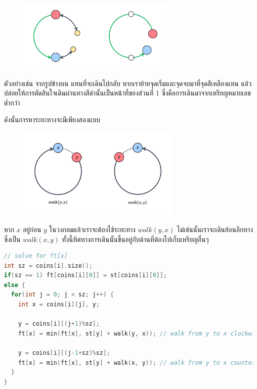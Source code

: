\documentclass[12pt]{article}
\begin{document}

\begin{figure}[h]
  \centering
  \includegraphics[height=3.5cm]{./images/coins3.png}
\end{figure}

ตัวอย่างเช่น จากรูปข้างบน แทนที่จะเดินไปกลับ หากเราย้ายจุดเริ่มและจุดจบมาที่จุดสีเหลืองแทน แล้วปล่อยให้การตัดสินใจเดินผ่านทางสีดำนั้นเป็นหน้าที่ของส่วนที่ 1 ซึ่งคือการเดินมาจากเหรียญหมายเลขต่ำกว่า

\newpage
ดังนั้นการหาระยะทางจะมีเพียงสองแบบ

\begin{figure}[h]
  \centering
  \includegraphics[height=4.5cm]{./images/coins4.png}
\end{figure}

หาก $x$ อยู่ก่อน $y$ ในวงกลมแล้วเราจะต้องใช้ระยะทาง $walk(y, x)$ ไม่เช่นนั้นเราจะเดินย้อนอีกทางซึ่งเป็น $walk(x, y)$ ทั้งนี้ทิศทางการเดินนั้นขึ้นอยู่กับด้านที่ต้องไปเก็บเหรียญอื่นๆ

\begin{lstlisting}[language=C++]
// solve for ft[x]
int sz = coins[i].size();
if(sz == 1) ft[coins[i][0]] = st[coins[i][0]];
else {
  for(int j = 0; j < sz; j++) {
    int x = coins[i][j], y;

    y = coins[i][(j+1)%sz];
    ft[x] = min(ft[x], st[y] + walk(y, x)); // walk from y to x clockwise

    y = coins[i][(j-1+sz)%sz];
    ft[x] = min(ft[x], st[y] + walk(x, y)); // walk from y to x counter-clockwise
  }
}
\end{lstlisting}
\end{document}
